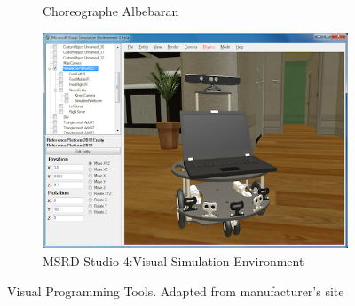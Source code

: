 {\begin{figure}[H]
\begin{subfigure}[b]{0.5\textwidth}
\caption{Choreographe Albebaran}
\label{fig:choreographe}
\end{subfigure}%
\begin{subfigure}[b]{0.5\textwidth}
\includegraphics[width=\textwidth]{assets/MSRD4_VSE2.png}
\caption{MSRD Studio 4:Visual Simulation Environment}
\label{fig:msrd4_vse}
\end{subfigure}%
\caption[Visual Programming Tools]{Visual Programming Tools. {Adapted from manufacturer's site}}
\label{fig:visprog}
\end{figure}
}
